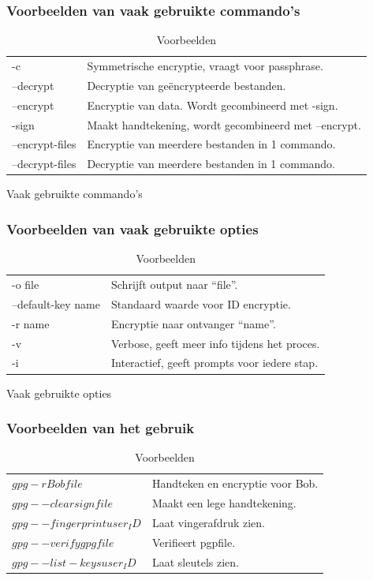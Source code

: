 \documentclass[12pt]{article}
\begin{document}
				\newpage
				\subsubsection{Voorbeelden van vaak gebruikte commando's}\label{com}
					\begin{table}[!ht] \cite{Commando}
						\begin{tabular}{l|l}
								-c				&	Symmetrische encryptie, vraagt voor passphrase\index{Passphrase}.\\
								--decrypt			&	Decryptie\index{Decryptie} van ge\"encrypteerde bestanden.\\
								--encrypt			&	Encryptie van data. Wordt gecombineerd met -sign.\\
								-sign				&	Maakt handtekening, wordt gecombineerd met --encrypt.\\
								--encrypt-files	&	Encryptie van meerdere bestanden in 1 commando.\\
								--decrypt-files	&	Decryptie van meerdere bestanden in 1 commando.\\
						\end{tabular}
						\caption{Vaak gebruikte commando's}						
					
				\subsubsection{Voorbeelden van vaak gebruikte opties}\label{opt}\cite{Commando}					
						\begin{tabular}{l|l}
								-o file				&	Schrijft output naar \textquotedblleft file\textquotedblright.\\
								--default-key name	&	Standaard waarde voor ID encryptie.\\
								-r name				&	Encryptie naar ontvanger \textquotedblleft name\textquotedblright.\\
								-v					&	Verbose\index{Verbose}, geeft meer info tijdens het proces.\\
								-i					&	Interactief, geeft prompts\index{Prompts} voor iedere stap.\\
						\end{tabular}\caption{Vaak gebruikte opties}
											
				\subsubsection{Voorbeelden van het gebruik}\label{use}\cite{Commando}
						\begin{tabular}{l|l}
								$gpg -r Bob file$				&	Handteken en encryptie voor Bob.\\
								$gpg --clearsign file$			&	Maakt een lege handtekening\index{Handtekening}.\\
								$gpg --fingerprint user_ID$		&	Laat vingerafdruk zien.\\
								$gpg --verify gpgfile$			&	Verifieert pgpfile.\\
								$gpg --list-keys user_ID$		&	Laat sleutels zien.\\
						\end{tabular}
						\caption{Voorbeelden}
					\end{table}	
				\cite{Tabellen}
			
\end{document}
